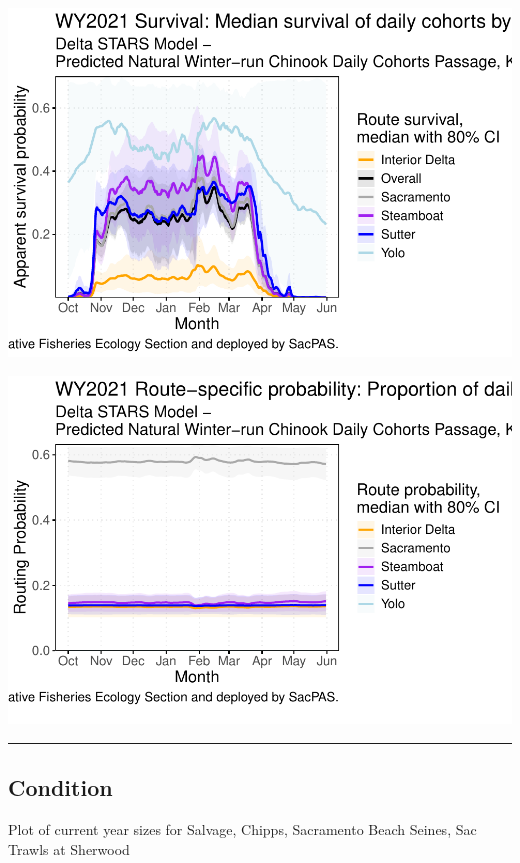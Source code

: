 \documentclass[
]{book}
\theoremstyle{definition}
\theoremstyle{definition}
\theoremstyle{definition}
\theoremstyle{definition}
\theoremstyle{remark}
\begin{document}
\includegraphics{_main_files/figure-latex/survival-fig-1.pdf}

\includegraphics{_main_files/figure-latex/routing-fig-1.pdf}

\begin{center}\rule{0.5\linewidth}{0.5pt}\end{center}

\hypertarget{condition-2}{%
\subsection{Condition}\label{condition-2}}

Plot of current year sizes for Salvage, Chipps, Sacramento Beach Seines, Sac Trawls at Sherwood
\end{document}
